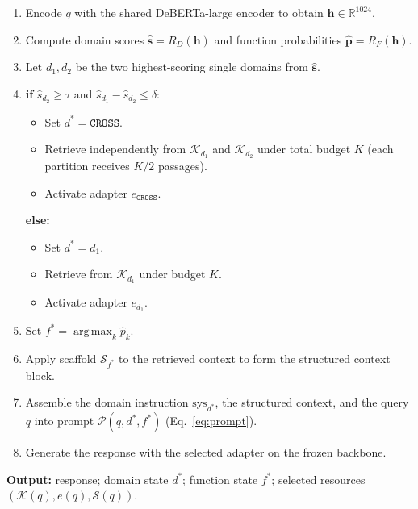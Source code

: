 \documentclass[a4paper,fleql,doubleblind]{cas-sc}
\DeclareMathOperator*{\argmax}{arg\,max}
\begin{document}
\begin{tcolorbox}[colback=gray!4, colframe=gray!35, arc=3pt, boxrule=0.6pt,
  left=10pt, right=10pt, top=8pt, bottom=8pt,
  title={\textbf{Algorithm 1: NexRoute Inference}}, fonttitle=\bfseries]
\vspace{4pt}
\begin{enumerate}
\item Encode $q$ with the shared DeBERTa-large encoder to obtain $\mathbf{h} \in \mathbb{R}^{1024}$.
\item Compute domain scores $\hat{\mathbf{s}} = R_D(\mathbf{h})$ and
      function probabilities $\hat{\mathbf{p}} = R_F(\mathbf{h})$.
\item Let $d_1, d_2$ be the two highest-scoring single domains from $\hat{\mathbf{s}}$.
\item \textbf{if} $\hat{s}_{d_2} \geq \tau$ and $\hat{s}_{d_1} - \hat{s}_{d_2} \leq \delta$:
      \begin{itemize}
      \item Set $d^* = \texttt{CROSS}$.
      \item Retrieve independently from $\mathcal{K}_{d_1}$ and $\mathcal{K}_{d_2}$
            under total budget $K$ (each partition receives $K/2$ passages).
      \item Activate adapter $e_\texttt{CROSS}$.
      \end{itemize}
\textbf{else:}
      \begin{itemize}
      \item Set $d^* = d_1$.
      \item Retrieve from $\mathcal{K}_{d_1}$ under budget $K$.
      \item Activate adapter $e_{d_1}$.
      \end{itemize}
\item Set $f^* = \argmax_k \hat{p}_k$.
\item Apply scaffold $\mathcal{S}_{f^*}$ to the retrieved context to form
      the structured context block.
\item Assemble the domain instruction $\mathrm{sys}_{d^*}$, the structured context,
      and the query $q$ into prompt $\mathcal{P}(q, d^*, f^*)$ (Eq.~\ref{eq:prompt}).
\item Generate the response with the selected adapter on the frozen backbone.
\end{enumerate}

\vspace{4pt}
\textbf{Output:} response; domain state $d^*$; function state $f^*$;
selected resources $(\mathcal{K}(q), e(q), \mathcal{S}(q))$.
\end{tcolorbox}
\vspace{4pt}

\end{document}
